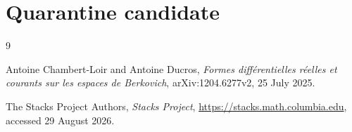 \documentclass[11pt]{article}
\begin{document}
\section*{Quarantine candidate}




\begin{sloppypar}
\begin{thebibliography}{9}
\raggedright

Antoine Chambert-Loir and Antoine Ducros,
\emph{Formes diff\'erentielles r\'eelles et courants sur les espaces de
Berkovich}, arXiv:1204.6277v2, 25 July 2025.

The Stacks Project Authors,
\emph{Stacks Project},
\url{https://stacks.math.columbia.edu}, accessed 29 August 2026.

\end{thebibliography}
\end{sloppypar}
\end{document}
